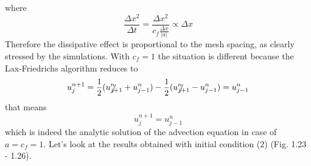 \documentclass[11pt,a4paper]{article}
\begin{document}
where
\begin{equation}
\frac{\Delta x^2}{\Delta t} = \frac{\Delta x^2}{c_f\frac{\Delta x}{|a|}} \propto \Delta x
\end{equation}
Therefore the dissipative effect is proportional to the mesh spacing, as clearly stressed by the simulations. With $c_f = 1$ the situation is different because the Lax-Friedrichs algorithm reduces to
\[
u_j^{n+1} = \frac{1}{2}(\slashed{u_{j+1}^n} + u^n_{j-1}) - \frac{1}{2}(\slashed{u^n_{j+1}} - u_{j-1}^n) = u^n_{j-1}
\] 
that means
\begin{equation}
u_j^{n+1} = u^n_{j-1}
\end{equation}
which is indeed the analytic solution of the advection equation in case of $a = c_f = 1$. Let's look at the results obtained with initial condition (2) (Fig. 1.23 - 1.26). 
\begin{figure}[!h]
\centering
{}

\end{figure}
\end{document}
